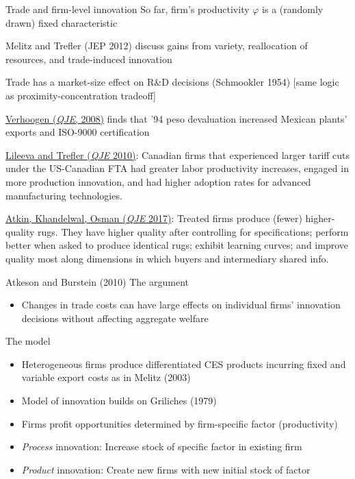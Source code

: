 \documentclass[10pt,notes=hide]{beamer}
\begin{document}
\begin{frame}{Trade and firm-level innovation}
{\small So far, firm's productivity $\varphi$ is a (randomly drawn) fixed characteristic}
\begin{itemize}
{\small 
\item Melitz and Trefler (JEP 2012) discuss gains from variety, reallocation of resources, and trade-induced innovation
\item Trade has a market-size effect on R\&D decisions (Schmookler 1954) [same logic as proximity-concentration tradeoff]
\item \href{https://academic.oup.com/qje/article-abstract/123/2/489/1930844}{Verhoogen (\textit{QJE}, 2008)} finds that '94 peso devaluation increased Mexican plants' exports and ISO-9000 certification
\item \href{http://qje.oxfordjournals.org.proxy.uchicago.edu/content/125/3/1051.short}{Lileeva and Trefler (\textit{QJE} 2010)}: Canadian firms that experienced larger tariff cuts under the US-Canadian FTA had greater labor productivity increases, engaged in more production innovation, and had higher adoption rates for advanced manufacturing technologies.
\item \href{https://academic.oup.com/qje/article/132/2/551/3002609}{Atkin, Khandelwal, Osman (\textit{QJE} 2017)}: Treated firms produce (fewer) higher-quality rugs. They have higher quality after controlling for specifications; perform better when asked to produce identical rugs; exhibit learning curves; and improve quality most along dimensions in which buyers and intermediary shared info.
}
\end{itemize}
\end{frame}
\begin{frame}{Atkeson and Burstein (2010)}
The argument
\begin{itemize}
\item Changes in trade costs can have large effects on individual firms' innovation decisions without affecting aggregate welfare
\end{itemize}
The model
\begin{itemize}
	\item Heterogeneous firms produce differentiated CES products incurring fixed and variable export costs as in Melitz (2003)
	\item Model of innovation builds on Griliches (1979)
	\item Firms profit opportunities determined by firm-specific factor (productivity)
	\item \textit{Process} innovation: Increase stock of specific factor in existing firm
	\item \textit{Product} innovation: Create new firms with new initial stock of factor
\end{itemize}
\end{frame}
\end{document}
